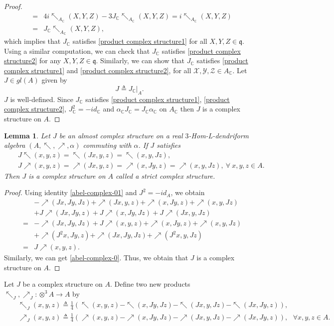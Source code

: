 \documentclass[a4paper,11pt]{article}
\def\a{\alpha}
\def\nw{\nwarrow}
\def\ne{\nearrow}
\newtheorem{lem}[thm]{Lemma}
\theoremstyle{definition}
\begin{document}
\begin{proof}
\begin{eqnarray*}
&=&4i\nw_{ A_{\mathbb C}}(X,Y,Z)-3J_{\mathbb C}\nw_{ A_{\mathbb C}}(X,Y,Z)=i\nw_{ A_{\mathbb C}}(X,Y,Z)\\
&=&J_{\mathbb C}\nw_{ A_{\mathbb C}}(X,Y,Z),
\end{eqnarray*}
which implies that $J_{\mathbb C}$ satisfies   \eqref{product complex structure1} for all $X,Y,Z\in\mathfrak{q}$. Using a similar computation, we can check that $J_{\mathbb C}$ satisfies   \eqref{product complex structure2} for any $X,Y,Z\in\mathfrak{q}$.  Similarly, we can show that $J_{\mathbb C}$ satisfies   \eqref{product complex structure1} and   \eqref{product complex structure2}, for all $\mathcal{X},\mathcal{Y},\mathcal{Z}\in A_{\mathbb C}$. Let $J\in gl( A)$ given by $$J\triangleq J_{\mathbb C}|_{ A}.$$
$J$ is well-defined.  Since $J_{\mathbb C}$  satisfies \eqref{product complex structure1}, \eqref{product complex structure2}, $J_{\mathbb C}^2=-id_{\mathbb C}$ and  $\a_{\mathbb C}J_{\mathbb C}=J_{\mathbb C}\a_{\mathbb C}$ on $ A_{\mathbb C}$ then $J$ is a complex structure on $ A$.
 \end{proof}
\begin{lem}
  Let $J$ be an almost complex structure on a real $3$-Hom-L-dendriform algebra $(A,\nw,\ne,\alpha)$ commuting with $\a$.
    If $J$ satisfies
     \begin{eqnarray}\label{abel-complex-0}
&&J\nw(x,y,z)=\nw(Jx,y,z)=\nw(x,y,Jz),\\&&\label{abel-complex-01} J\ne(x,y,z)=\ne(Jx,y,z)=\ne(x,Jy,z)=\ne(x,y,Jz),\ \forall \ x,y,z\in A.
\end{eqnarray}
Then $J$ is a complex structure on $A$ called a strict complex structure.
\end{lem}
\begin{proof}
  Using identity \eqref{abel-complex-01} and $J^2=-id_A$, we obtain
\begin{eqnarray*}
&&-\ne(Jx,Jy,Jz)+\ne(Jx,y,z)+\ne(x,Jy,z)+\ne(x,y,Jz)\\
&&+J\ne(Jx,Jy,z)+J\ne(x,Jy,Jz)+J\ne(Jx,y,Jz)\\
&=&-\ne(Jx,Jy,Jz)+J\ne(x,y,z)+\ne(x,Jy,z)+\ne(x,y,Jz)\\
&&+\ne(J^2x,Jy,z)+\ne(Jx,Jy,Jz)+\ne(J^2x,y,Jz)\\
&=&J\ne(x,y,z).
\end{eqnarray*}
Similarly, we can get \eqref{abel-complex-0}.
Thus, we obtain that $J$ is a complex structure on $A$.
\end{proof}
Let $J$ be a complex structure on $A$. Define   two new products $\nw_J,\ne_J:\otimes^3A\to A$ by
\begin{eqnarray}\label{J-bracket1}
&&\nw_J(x,y,z)\triangleq \frac{1}{4}(\nw(x,y,z)-\nw(x,Jy,Jz)-\nw(Jx,y,Jz)-\nw(Jx,Jy,z)),\\\label{J-bracket2}
&&\ne_J(x,y,z)\triangleq \frac{1}{4}(\ne(x,y,z)-\ne(x,Jy,Jz)-\ne(Jx,y,Jz)-\ne(Jx,Jy,z)),\,\,\,\,\forall x,y,z\in A.
\end{eqnarray}
\end{document}
